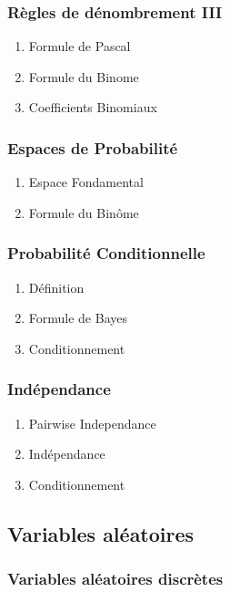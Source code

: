 \documentclass{article}
\begin{document}
\subsubsection{Règles de dénombrement III}

\begin{enumerate}
    \item Formule de Pascal
    \item Formule du Binome
    \item Coefficients Binomiaux
\end{enumerate}

\subsubsection{Espaces de Probabilité}

\begin{enumerate}
    \item Espace Fondamental
    \item Formule du Binôme
\end{enumerate}

\subsubsection{Probabilité Conditionnelle}

\begin{enumerate}
    \item Définition
    \item Formule de Bayes
    \item Conditionnement
\end{enumerate}

\subsubsection{Indépendance}

\begin{enumerate}
    \item Pairwise Independance
    \item Indépendance
    \item Conditionnement
\end{enumerate}

\subsection{Variables aléatoires}

\subsubsection{Variables aléatoires discrètes}
\end{document}
